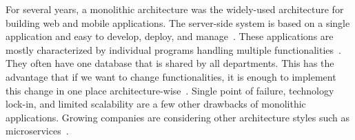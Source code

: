 \par For several years, a monolithic architecture was the widely-used architecture for building web and mobile applications. The server-side system is based on a single application and easy to develop, deploy, and manage~\cite{Danbettinger2019}. These applications are mostly characterized by individual programs handling multiple functionalities~\cite{Francesco2019}. They often have one database that is shared by all departments. This has the advantage that if we want to change functionalities, it is enough to implement this change in one place architecture-wise~\cite{Pavlovic2020}. 
Single point of failure, technology lock-in, and limited scalability are a few other drawbacks of monolithic applications. Growing companies are considering other architecture styles such as microservices~\cite{Lenga2019, Jag2017, Rodrigue2016}. 




